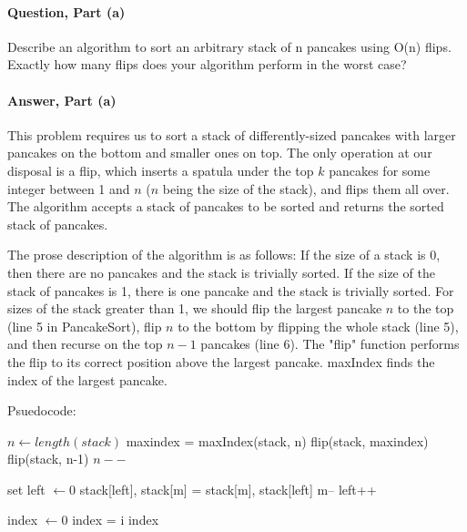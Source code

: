 \documentclass{article}
\begin{document}
\paragraph{Question, Part (a)}{Describe an algorithm to sort an arbitrary stack of n pancakes using O(n) flips. Exactly how many flips does your algorithm perform in the worst case?}
\paragraph{Answer, Part (a)}{This problem requires us to sort a stack of differently-sized pancakes with larger pancakes on the bottom and smaller ones on top. The only operation at our disposal is a flip, which inserts a spatula under the top $k$ pancakes for some integer between 1 and $n$ ($n$ being the size of the stack), and flips them all over. The algorithm accepts a stack of pancakes to be sorted and returns the sorted stack  of pancakes.

The prose description of the algorithm is as follows: If the size of a stack is 0, then there are no pancakes and the stack is trivially sorted. If the size of the stack of pancakes is 1, there is one pancake and the stack is trivially sorted. For sizes of the stack greater than 1, we should flip the largest pancake $n$ to the top (line 5 in PancakeSort), flip $n$ to the bottom by flipping the whole stack (line 5), and then recurse on the top $n-1$ pancakes (line 6). The "flip" function performs the flip to its correct position above the largest pancake. maxIndex finds the index of the largest pancake. 

Psuedocode:
\begin{algorithmic}
\State $n\gets length(stack)$
	\State maxindex = maxIndex(stack, n)
	\State flip(stack, maxindex)
	\State flip(stack, n-1)
	\State $n--$
\EndWhile
\EndFunction
\end{algorithmic}

\begin{algorithmic}
\State set left $\gets 0$
	\State stack[left], stack[m] = stack[m], stack[left]
	\State m--
	\State left++
\EndWhile
\EndFunction
\end{algorithmic}
\begin{algorithmic}
\State index $\gets 0$
		\State index = i
	\EndIf
\EndFor
\State \Return index
\EndFunction
\end{algorithmic}

}
\end{document}
